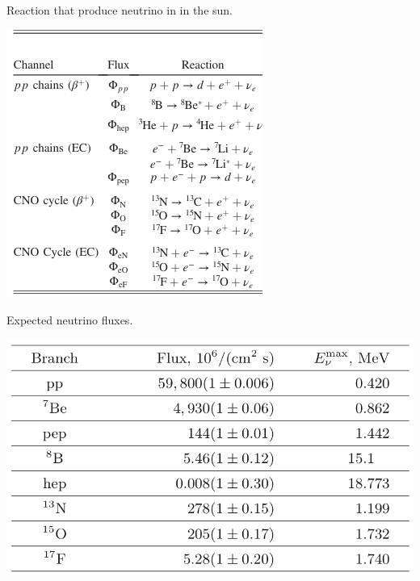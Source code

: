 \noindent
\begin{minipage}[t]{0.45\textwidth}
\begin{table}[H]
	\centering
	\captionsetup{width=\textwidth}
	\caption{Reaction that produce neutrino in in the sun.}
	\includegraphics[width=\textwidth]{assets/ReactionProd.png}
	\label{table:RNeu}
\end{table}
\end{minipage}\hfill
\begin{minipage}[t]{0.45\textwidth}
	\begin{table}[H]
	\centering
	\captionsetup{width=\textwidth}
	\caption{Expected neutrino fluxes.}
	\includegraphics[width=\textwidth,height=\textheight]{assets/SSMexpect.png}
	\label{table:SSMflux}
\end{table}
\end{minipage}

